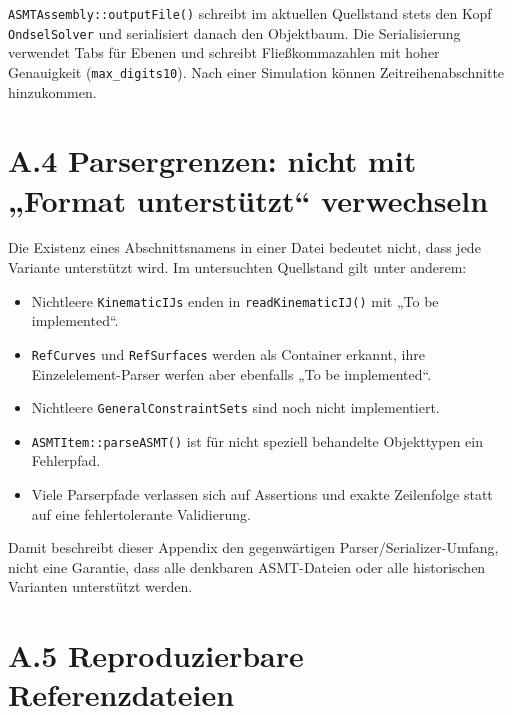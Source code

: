 \documentclass[
  12pt
]{book}
\providecommand{\tightlist}{%
  \setlength{\itemsep}{0pt}\setlength{\parskip}{0pt}}
\begin{document}
\texttt{ASMTAssembly::outputFile()} schreibt im aktuellen Quellstand
stets den Kopf \texttt{OndselSolver} und serialisiert danach den
Objektbaum. Die Serialisierung verwendet Tabs für Ebenen und schreibt
Fließkommazahlen mit hoher Genauigkeit (\texttt{max\_digits10}). Nach
einer Simulation können Zeitreihenabschnitte hinzukommen.

\hypertarget{parsergrenzen-nicht-mit-format-unterstuxfctzt-verwechseln}{%
\section{\texorpdfstring{{A.4} Parsergrenzen: nicht mit „Format
unterstützt``
verwechseln}{A.4 Parsergrenzen: nicht mit „Format unterstützt`` verwechseln}}\label{parsergrenzen-nicht-mit-format-unterstuxfctzt-verwechseln}}

Die Existenz eines Abschnittsnamens in einer Datei bedeutet nicht, dass
jede Variante unterstützt wird. Im untersuchten Quellstand gilt unter
anderem:

\begin{itemize}
\tightlist
\item
  Nichtleere \texttt{KinematicIJs} enden in \texttt{readKinematicIJ()}
  mit „To be implemented``.
\item
  \texttt{RefCurves} und \texttt{RefSurfaces} werden als Container
  erkannt, ihre Einzelelement-Parser werfen aber ebenfalls „To be
  implemented``.
\item
  Nichtleere \texttt{GeneralConstraintSets} sind noch nicht
  implementiert.
\item
  \texttt{ASMTItem::parseASMT()} ist für nicht speziell behandelte
  Objekttypen ein Fehlerpfad.
\item
  Viele Parserpfade verlassen sich auf Assertions und exakte Zeilenfolge
  statt auf eine fehlertolerante Validierung.
\end{itemize}

Damit beschreibt dieser Appendix den gegenwärtigen
Parser/Serializer-Umfang, nicht eine Garantie, dass alle denkbaren
ASMT-Dateien oder alle historischen Varianten unterstützt werden.

\hypertarget{reproduzierbare-referenzdateien}{%
\section{\texorpdfstring{{A.5} Reproduzierbare
Referenzdateien}{A.5 Reproduzierbare Referenzdateien}}\label{reproduzierbare-referenzdateien}}
\end{document}
